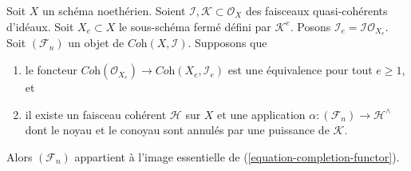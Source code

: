 \begin{lemma}
\label{lemma-existence-tricky}
Soit $X$ un schéma noethérien. Soient
$\mathcal{I}, \mathcal{K} \subset \mathcal{O}_X$
des faisceaux quasi-cohérents d'idéaux.
Soit $X_e \subset X$ le sous-schéma fermé défini par $\mathcal{K}^e$.
Posons $\mathcal{I}_e = \mathcal{I}\mathcal{O}_{X_e}$.
Soit $(\mathcal{F}_n)$ un objet de $\textit{Coh}(X, \mathcal{I})$. Supposons
que
\begin{enumerate}
\item le foncteur
$\textit{Coh}(\mathcal{O}_{X_e}) \to \textit{Coh}(X_e, \mathcal{I}_e)$
est une équivalence pour tout $e \geq 1$, et
\item il existe un faisceau cohérent $\mathcal{H}$ sur $X$ et une application
$\alpha : (\mathcal{F}_n) \to \mathcal{H}^\wedge$ dont
le noyau et le conoyau sont annulés par une puissance de $\mathcal{K}$.
\end{enumerate}
Alors $(\mathcal{F}_n)$ appartient à l'image essentielle de
(\ref{equation-completion-functor}).
\end{lemma}

